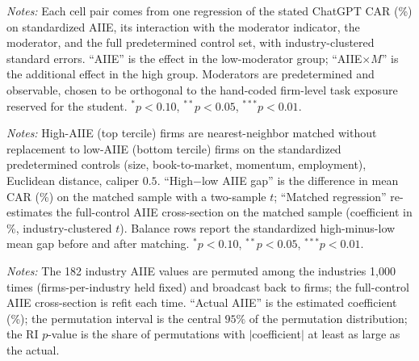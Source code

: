 \documentclass[12pt]{article}
\begin{document}
\begin{table}[htbp]\centering
\begin{threeparttable}
\caption{Heterogeneity of the priced-AIIE effect by observable moderators}\label{tab:hetero}\small

\begin{tablenotes}\small\item \textit{Notes:} Each cell pair comes from one regression of the
stated ChatGPT CAR (\%) on standardized AIIE, its interaction with the moderator indicator, the
moderator, and the full predetermined control set, with industry-clustered standard errors.
``AIIE'' is the effect in the low-moderator group; ``AIIE$\times M$'' is the additional effect
in the high group. Moderators are predetermined and observable, chosen to be orthogonal to the
hand-coded firm-level task exposure reserved for the student. $^{*}p<0.10$, $^{**}p<0.05$,
$^{***}p<0.01$.
\end{tablenotes}
\end{threeparttable}
\end{table}

\begin{table}[htbp]\centering
\begin{threeparttable}
\caption{Characteristic-matched design: does the priced-AIIE gap survive balancing?}\label{tab:matched}\small

\begin{tablenotes}\small\item \textit{Notes:} High-AIIE (top tercile) firms are nearest-neighbor
matched without replacement to low-AIIE (bottom tercile) firms on the standardized predetermined
controls (size, book-to-market, momentum, employment), Euclidean distance, caliper $0.5$.
``High$-$low AIIE gap'' is the difference in mean CAR (\%) on the matched sample with a two-sample
$t$; ``Matched regression'' re-estimates the full-control AIIE cross-section on the matched sample
(coefficient in \%, industry-clustered $t$). Balance rows report the standardized high-minus-low
mean gap before and after matching. $^{*}p<0.10$, $^{**}p<0.05$, $^{***}p<0.01$.
\end{tablenotes}
\end{threeparttable}
\end{table}

\begin{table}[htbp]\centering
\begin{threeparttable}
\caption{Industry-level randomization inference}\label{tab:ri}\small

\begin{tablenotes}\small\item \textit{Notes:} The 182 industry AIIE values are permuted among the
industries 1{,}000 times (firms-per-industry held fixed) and broadcast back to firms; the
full-control AIIE cross-section is refit each time. ``Actual AIIE'' is the estimated coefficient
(\%); the permutation interval is the central $95\%$ of the permutation distribution; the RI
$p$-value is the share of permutations with $|$coefficient$|$ at least as large as the actual.
\end{tablenotes}
\end{threeparttable}
\end{table}
\end{document}
